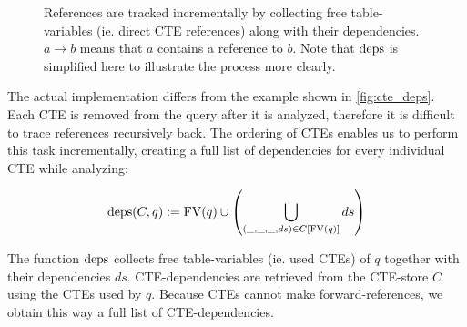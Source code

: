 \begin{figure}[h!]
    \centering
    \caption{References are tracked incrementally by collecting free table-variables (ie. direct CTE references) along with their dependencies. $a \rightarrow b$ means that $a$ contains a reference to $b$. Note that $\operatorname{\text{deps}}$ is simplified here to illustrate the process more clearly.}
    \label{fig:cte_deps}
\end{figure}

The actual implementation differs from the example shown in \autoref{fig:cte_deps}. Each CTE is removed from the query after it is analyzed, therefore it is difficult to trace references recursively back. The ordering of CTEs enables us to perform this task incrementally, creating a full list of dependencies for every individual CTE while analyzing:

$$\operatorname{\text{deps}}(C, q) := \operatorname{\text{\rm FV}}(q) \cup \left(\bigcup_{(\_, \_, \_, ds) \in C[\operatorname{\text{\rm FV}}(q)]} ds \right)$$

The function $\operatorname{\text{deps}}$ collects free table-variables (ie. used CTEs) of $q$ together with their dependencies $ds$. CTE-dependencies are retrieved from the CTE-store $C$ using the CTEs used by $q$. Because CTEs cannot make forward-references, we obtain this way a full list of CTE-dependencies.


